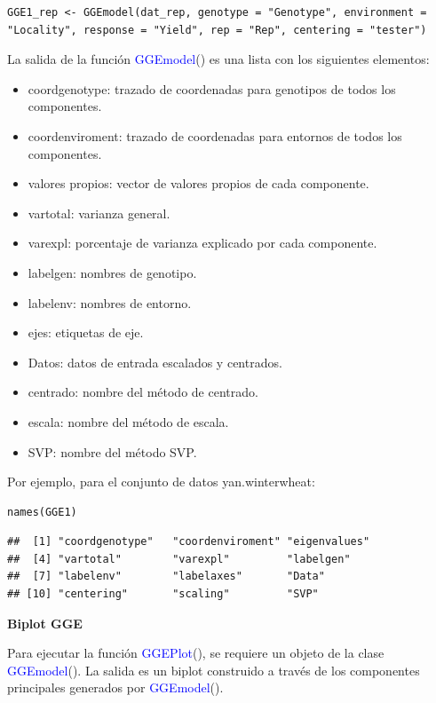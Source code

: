 \begin{lstlisting}
GGE1_rep <- GGEmodel(dat_rep, genotype = "Genotype", environment = "Locality", response = "Yield", rep = "Rep", centering = "tester")
\end{lstlisting}


La salida de la función \textcolor{blue}{GGEmodel}() es una lista con los siguientes elementos:


\begin{itemize}
\item coordgenotype: trazado de coordenadas para genotipos de todos los componentes.
\item coordenviroment: trazado de coordenadas para entornos de todos los componentes.
\item valores propios: vector de valores propios de cada componente.
\item vartotal: varianza general.
\item varexpl: porcentaje de varianza explicado por cada componente.
\item labelgen: nombres de genotipo.
\item labelenv: nombres de entorno.
\item ejes: etiquetas de eje.
\item Datos: datos de entrada escalados y centrados.
\item centrado: nombre del método de centrado.
\item escala: nombre del método de escala.
\item SVP: nombre del método SVP.
\end{itemize}


Por ejemplo, para el conjunto de datos yan.winterwheat:


\begin{lstlisting}
names(GGE1)
\end{lstlisting}

\begin{verbatim}
##  [1] "coordgenotype"   "coordenviroment" "eigenvalues"    
##  [4] "vartotal"        "varexpl"         "labelgen"       
##  [7] "labelenv"        "labelaxes"       "Data"           
## [10] "centering"       "scaling"         "SVP"
\end{verbatim}


\textbf{Biplot GGE}

Para ejecutar la función \textcolor{blue}{GGEPlot}(), se requiere un objeto de la clase \textcolor{blue}{GGEmodel}(). La salida es un biplot construido a través de los componentes principales generados por \textcolor{blue}{GGEmodel}().

